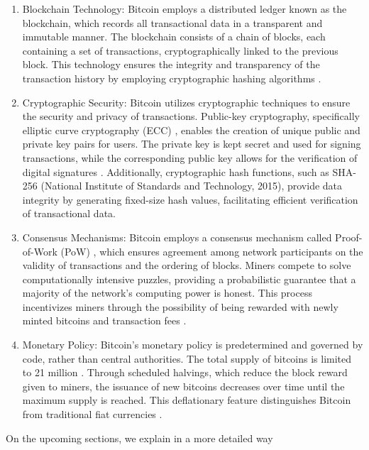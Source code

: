 \begin{enumerate}
    \item Blockchain Technology: Bitcoin employs a distributed ledger known as the blockchain, which records all transactional data in a transparent and immutable manner. The blockchain consists of a chain of blocks, each containing a set of transactions, cryptographically linked to the previous block. This technology ensures the integrity and transparency of the transaction history \cite{nakamoto2008bitcoin} by employing cryptographic hashing algorithms \cite{merkle1988digital}.
    \item Cryptographic Security: Bitcoin utilizes cryptographic techniques to ensure the security and privacy of transactions. Public-key cryptography, specifically elliptic curve cryptography (ECC) \cite{johnson2001elliptic}, enables the creation of unique public and private key pairs for users. The private key is kept secret and used for signing transactions, while the corresponding public key allows for the verification of digital signatures \cite{dworkin2016recommendation}. Additionally, cryptographic hash functions, such as SHA-256 (National Institute of Standards and Technology, 2015), provide data integrity by generating fixed-size hash values, facilitating efficient verification of transactional data.
    \item Consensus Mechanisms: Bitcoin employs a consensus mechanism called Proof-of-Work (PoW) \cite{dwork1993pricing}, which ensures agreement among network participants on the validity of transactions and the ordering of blocks. Miners compete to solve computationally intensive puzzles, providing a probabilistic guarantee that a majority of the network's computing power is honest. This process incentivizes miners through the possibility of being rewarded with newly minted bitcoins and transaction fees \cite{nakamoto2008bitcoin}.
    \item Monetary Policy: Bitcoin's monetary policy is predetermined and governed by code, rather than central authorities. The total supply of bitcoins is limited to 21 million \cite{nakamoto2008bitcoin}. Through scheduled halvings, which reduce the block reward given to miners, the issuance of new bitcoins decreases over time until the maximum supply is reached. This deflationary feature distinguishes Bitcoin from traditional fiat currencies \cite{maurer2013}.
\end{enumerate}

On the upcoming sections, we explain in a more detailed way 

